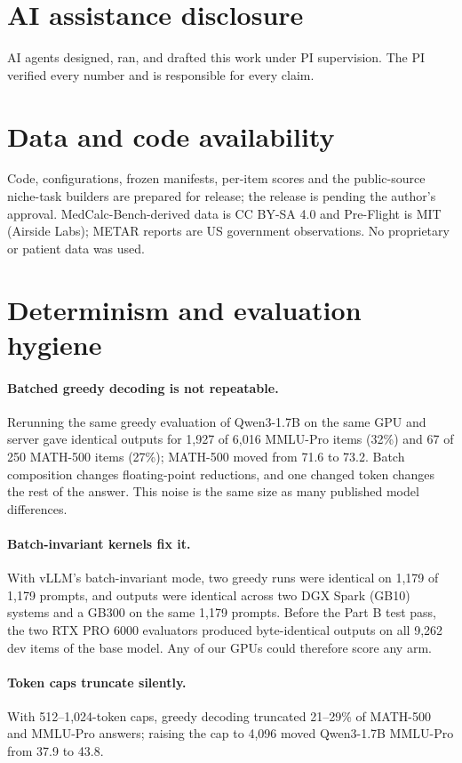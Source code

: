 \documentclass[11pt]{article}
\begin{document}
\section*{AI assistance disclosure}
AI agents designed, ran, and drafted this work under PI supervision. The PI verified every number and is responsible
for every claim.

\section*{Data and code availability}
Code, configurations, frozen manifests, per-item scores and the public-source niche-task builders are prepared for
release; the release is pending the author's approval. MedCalc-Bench-derived data is CC BY-SA 4.0 and Pre-Flight is
MIT (Airside Labs); METAR reports are US government observations. No proprietary or patient data was used.




\appendix

\section{Determinism and evaluation hygiene}
\label{app:determinism}
\paragraph{Batched greedy decoding is not repeatable.} Rerunning the same greedy evaluation of Qwen3-1.7B on the same
GPU and server gave identical outputs for 1,927 of 6,016 MMLU-Pro items (32\%) and 67 of 250 MATH-500 items (27\%);
MATH-500 moved from 71.6 to 73.2. Batch composition changes floating-point reductions, and one changed token
changes the rest of the answer. This noise is the same size as many published model differences.
\paragraph{Batch-invariant kernels fix it.} With vLLM's batch-invariant mode, two greedy runs were identical on 1,179
of 1,179 prompts, and outputs were identical across two DGX Spark (GB10) systems and a GB300 on the same 1,179
prompts. Before the Part B test pass, the two RTX PRO 6000 evaluators produced byte-identical outputs on all 9,262
dev items of the base model. Any of our GPUs could therefore score any arm.
\paragraph{Token caps truncate silently.} With 512--1,024-token caps, greedy decoding truncated 21--29\% of MATH-500
and MMLU-Pro answers; raising the cap to 4,096 moved Qwen3-1.7B MMLU-Pro from 37.9 to 43.8.
\end{document}

